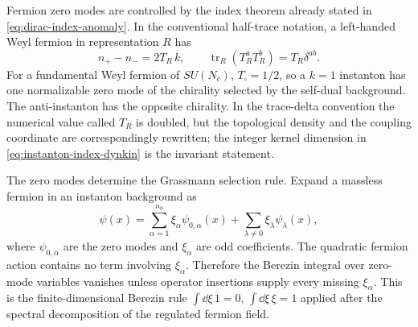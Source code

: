 Fermion zero modes are controlled by the index theorem already stated in
\eqref{eq:dirac-index-anomaly}.  In the conventional half-trace notation, a
left-handed Weyl fermion in representation \(R\) has
\begin{equation}
  n_+-n_-=2T_R\,k,
  \qquad
  \operatorname{tr}_R(T_R^aT_R^b)=T_R\delta^{ab}.
  \label{eq:instanton-index-dynkin}
\end{equation}
For a fundamental Weyl fermion of \(SU(N_c)\), \(T_\square=1/2\), so a
\(k=1\) instanton has one normalizable zero mode of the chirality selected by
the self-dual background.  The anti-instanton has the opposite chirality.  In
the trace-delta convention the numerical value called \(T_R\) is doubled, but
the topological density and the coupling coordinate are correspondingly
rewritten; the integer kernel dimension in
\eqref{eq:instanton-index-dynkin} is the invariant statement.

The zero modes determine the Grassmann selection rule.  Expand a massless
fermion in an instanton background as
\[
  \psi(x)=\sum_{\alpha=1}^{n_0}\xi_\alpha\psi_{0,\alpha}(x)
  +\sum_{\lambda\neq0}\xi_\lambda\psi_\lambda(x),
\]
where \(\psi_{0,\alpha}\) are the zero modes and \(\xi_\alpha\) are odd
coefficients.  The quadratic fermion action contains no term involving
\(\xi_\alpha\).  Therefore the Berezin integral over zero-mode variables
vanishes unless operator insertions supply every missing \(\xi_\alpha\).
This is the finite-dimensional Berezin rule \(\int\dd\xi\,1=0\),
\(\int\dd\xi\,\xi=1\) applied after the spectral decomposition of the
regulated fermion field.

